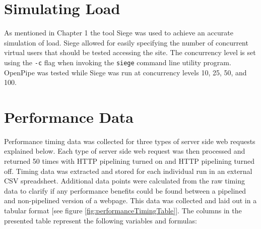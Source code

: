 \documentclass[12pt]{report}
\begin{document}
\section{Simulating Load}
As mentioned in Chapter 1 the tool Siege was used to achieve an accurate simulation of load. Siege allowed for easily specifying the number of concurrent virtual users that should be tested accessing the site. The concurrency level is set using the \texttt{-c} flag when invoking the \texttt{siege} command line utility program.  OpenPipe was tested while Siege was run at concurrency levels 10, 25, 50, and 100. 
 

\section{Performance Data}
Performance timing data was collected for three types of server side web requests explained below. Each type of server side web request was then processed and returned 50 times with HTTP pipelining turned on and HTTP pipelining turned off. Timing data was extracted and stored for each individual run in an external CSV spreadsheet. Additional data points were calculated from the raw timing data to clarify if any performance benefits could be found between a pipelined and non-pipelined version of a webpage. This data was collected and laid out in a tabular format [see figure \ref{fig:performanceTimingTable}]. The columns in the presented table represent the following variables and formulas:
\end{document}
